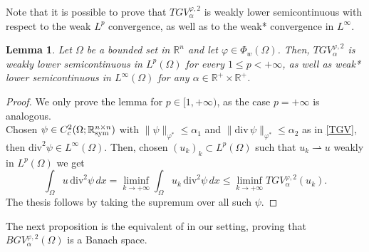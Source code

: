 \documentclass[a4paper,11pt,oneside,notitlepage]{article}
\newtheorem{lemma}[theorem]{Lemma}
\numberwithin{equation}{section}
\def\R{\mathbb{R}}
\def\sym{{\rm sym}}
\renewcommand{\div}{\mathrm{div}}
\newcommand{\vphi}{\varphi}
\begin{document}
Note that it is possible to prove that $TGV^{\vphi,2}_\alpha$ is weakly lower semicontinuous with respect to the weak $L^p$ convergence, as well as to the weak* convergence in $L^\infty$.

\begin{lemma}
\label{lmm:lsc_TGV}
    Let $\Omega$ be a bounded set in $\R^n$ and let $\vphi \in \Phi_w(\Omega)$. Then, 
    $TGV^{\vphi,2}_\alpha$ is weakly lower semicontinuous in $L^p(\Omega)$ for every $1 \le p < +\infty$, as well as weak* lower semicontinuous in $L^\infty(\Omega)$ for any $\alpha \in \R^+ \times \R^+$.
\end{lemma}
\begin{proof}
    We only prove the lemma for $p \in [1, +\infty)$, as the case $p = +\infty$ is analogous.
    \\
    Chosen $\psi \in C^2_c(\Omega; \R^{n \times n}_\sym)$ with $\|\psi\|_{\vphi^*} \le \alpha_1$ and $\|\div \, \psi\|_{\vphi^*} \le \alpha_2$ as in \eqref{TGV}, then $\div^2 \psi \in L^\infty(\Omega)$. Then, chosen $(u_k)_k \subset L^p(\Omega)$ such that $u_k \rightharpoonup u$ weakly in $L^p(\Omega)$ we get
    \begin{equation*}
        \int_\Omega u \, \div^2\psi \, dx = \liminf_{k \to +\infty} \int_\Omega u_k \, \div^2\psi \, dx \le \liminf_{k \to +\infty} TGV^{\vphi,2}_\alpha(u_k).
    \end{equation*}
    The thesis follows by taking the supremum over all such $\psi$.
\end{proof}


The next proposition is the equivalent of \cite[Proposition 3.5]{BKP10} in our setting, proving that $BGV^{\vphi,2}_\alpha(\Omega)$ is a Banach space.
\end{document}
